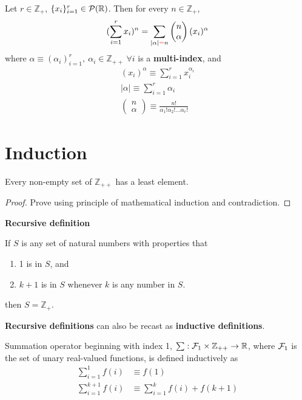 \documentclass{article}
\def\Z{{\mathbb Z}}
\def\R{{\mathbb R}}
\newcommand{\bi}[2]{\begin{pmatrix}{#1}\\{#2}\end{pmatrix}}
\begin{document}
		\begin{theorem}
			Let $r \in \Z_+$, $\{x_i\}_{i=1}^r \in \mc{P}(\R)$. Then for every $n \in \Z_+$,
			\begin{equation}
				(\sum_{i=1}^r x_i)^n = \sum_{|\alpha|\red{=}n} \bi{n}{\alpha} (x_i)^\alpha
			\end{equation}
			where $\alpha \equiv (\alpha_i)_{i=1}^r,\ \alpha_i \in \Z_{++}\ \forall i$ is a \textbf{multi-index}, and 
			\begin{gather}
				(x_i)^\alpha \equiv \sum_{i=1}^r x_i^{\alpha_i} \\
				|\alpha| \equiv \sum_{i=1}^r \alpha_i \\
				\bi{n}{\alpha} \equiv \frac{n!}{\alpha_1!\alpha_2!\dots\alpha_r!}
			\end{gather}
		\end{theorem}
		
	\section{Induction}
		\begin{theorem}
			Every non-empty set of $\Z_{++}$ has a least element.
			\begin{proof}
				Prove using principle of mathematical induction and contradiction.
			\end{proof}
		\end{theorem}
		
		\begin{definition}
			\textbf{Recursive definition}
		\end{definition}
		
		\begin{theorem}
			If $S$ is any set of natural numbers with properties that
			\begin{enumerate}
				\item 1 is in $S$, and
				\item $k+1$ is in $S$ whenever $k$ is any number in $S$.
			\end{enumerate}
			then $S = \Z_+$.
		\end{theorem}
		
		\begin{remark}
			\textbf{Recursive definitions} can also be recast as \textbf{inductive definitions}.
		\end{remark}
		
		\begin{definition}[Summation]
			Summation operator beginning with index 1, $\sum: \mc{F}_1 \times \Z_{++} \to \R$, where $\mathcal{{F}}_1$ is the set of unary real-valued functions, is defined inductively as
			\begin{align}
				\sum_{i=1}^1 f(i) &\equiv f(1) \\
				\sum_{i=1}^{k+1} f(i) &\equiv \sum_{i=1}^k f(i) + f(k+1)
			\end{align}
		\end{definition}
		
\end{document}
